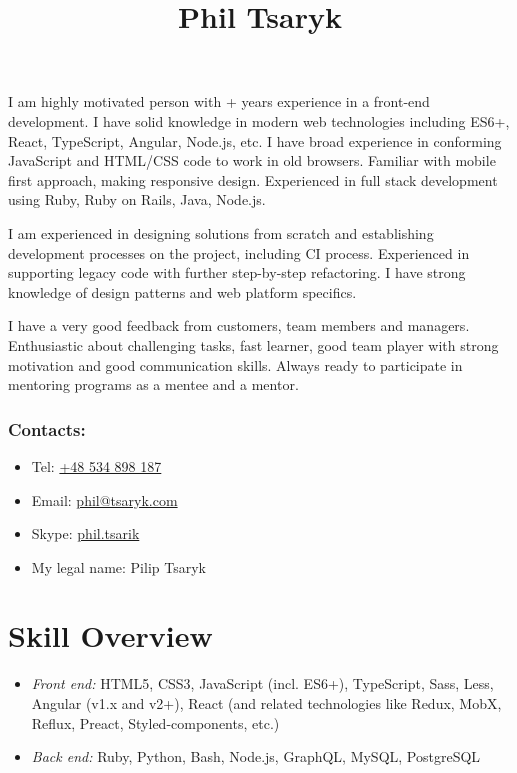 \documentclass[a4paper, 12pt]{article}
\title{Phil Tsaryk}
\author{}
\date{}
\newcommand{\itemlabel}[1]{
    \textit{#1:}}
\newcommand{\defvalue}[2]{\ifx#1\empty#2\else#1\fi}
\newcommand{\yearsexp}{%
    \FPeval{\result}{clip(\the\year - 2011)}%
    \defvalue{\result}{6+}}
\begin{document}
\maketitle

I am highly motivated person with \yearsexp{} years experience in a front-end development.
I have solid knowledge in modern web technologies including ES6+, React, TypeScript, Angular, Node.js, etc.
I have broad experience in conforming JavaScript and HTML/CSS code to work in old browsers.
Familiar with mobile first approach, making responsive design.
Experienced in full stack development using Ruby, Ruby on Rails, Java, Node.js.

I am experienced in designing solutions from scratch and establishing development processes on the project, including CI process.
Experienced in supporting legacy code with further step-by-step refactoring.
I have strong knowledge of design patterns and web platform specifics.

I have a very good feedback from customers, team members and managers.
Enthusiastic about challenging tasks, fast learner, good team player with strong motivation and good communication skills.
Always ready to participate in mentoring programs as a mentee and a mentor.

\subsubsection*{Contacts:}
\begin{itemize}
    \item Tel: \href{tel:+48534898187}{+48 534 898 187}
    \item Email: \href{mailto:phil@tsaryk.com}{phil@tsaryk.com}
    \item Skype: \href{callto:phil.tsarik}{phil.tsarik}
    \item My legal name: Pilip Tsaryk
\end{itemize}


\section*{Skill Overview}

    \begin{itemize}
        \item \itemlabel{Front end} HTML5, CSS3, JavaScript (incl. ES6+), TypeScript, Sass, Less, Angular (v1.x and v2+), React (and related technologies like Redux, MobX, Reflux, Preact, Styled-components, etc.)
        \item \itemlabel{Back end} Ruby, Python, Bash, Node.js, GraphQL, MySQL, PostgreSQL
    \end{itemize}
\end{document}
